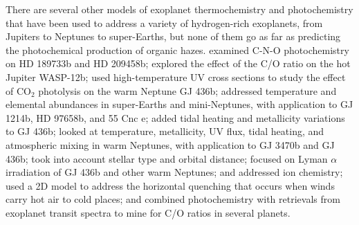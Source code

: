 \documentclass[preprint]{aastex6}
\begin{document}
There are several other models of exoplanet thermochemistry and photochemistry that have been 
used to address a variety of hydrogen-rich exoplanets, from Jupiters to Neptunes to super-Earths,
but none of them go as far as predicting the photochemical production of organic hazes.
\citet{Venot2012} examined C-N-O photochemistry on HD 189733b and HD 209458b; 
\citet{Kopparapu2012} explored the effect of the C/O ratio on the hot Jupiter WASP-12b;
\citet{Venot2013} used high-temperature UV cross sections to study the effect of CO$_2$ photolysis on the warm Neptune GJ 436b;
\cite{Hu2014} addressed temperature and elemental abundances in super-Earths and mini-Neptunes, with application to GJ 1214b, HD 97658b, and 55 Cnc e; 
\citet{Agundez2014b} added tidal heating and metallicity variations to GJ 436b;
\citet{Venot2014} looked at temperature, metallicity, UV flux, tidal heating, and atmospheric mixing in warm Neptunes, with application to GJ 3470b and GJ 436b;
\cite{Miguel2014} took into account stellar type and orbital distance; 
\cite{Miguel2015} focused on Lyman $\alpha$ irradiation of GJ 436b and other warm Neptunes;
\citet{Koskinen2013} and \citet{Lavvas2014} addressed ion chemistry;
\citet{Agundez2012,Agundez2014a} used a 2D model to address the horizontal quenching that occurs when winds carry hot air to cold places;
and \citet{Benneke2015} combined photochemistry with retrievals from exoplanet transit spectra to mine for C/O ratios in several planets. 
\end{document}
